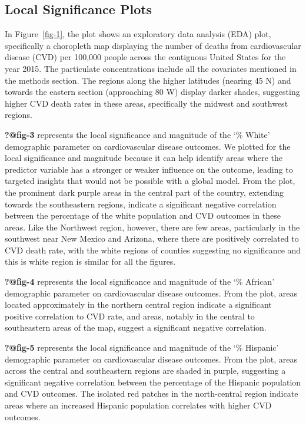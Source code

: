 \documentclass[
]{article}
\begin{document}
\subsection{Local Significance Plots}\label{local-significance-plots}

In Figure~\ref{fig-1}, the plot shows an exploratory data analysis (EDA)
plot, specifically a choropleth map displaying the number of deaths from
cardiovascular disease (CVD) per 100,000 people across the contiguous
United States for the year 2015. The particulate concentrations include
all the covariates mentioned in the methods section. The regions along
the higher latitudes (nearing 45 N) and towards the eastern section
(approaching 80 W) display darker shades, suggesting higher CVD death
rates in these areas, specifically the midwest and southwest regions.~

\textbf{?@fig-3} represents the local significance and magnitude of the
`\% White' demographic parameter on cardiovascular disease outcomes. We
plotted for the local significance and magnitude because it can help
identify areas where the predictor variable has a stronger or weaker
influence on the outcome, leading to targeted insights that would not be
possible with a global model. From the plot, the prominent dark purple
areas in the central part of the country, extending towards the
southeastern regions, indicate a significant negative correlation
between the percentage of the white population and CVD outcomes in these
areas. Like the Northwest region, however, there are few areas,
particularly in the southwest near New Mexico and Arizona, where there
are positively correlated to CVD death rate, with the white regions of
counties suggesting no significance and this is white region is similar
for all the figures.

\textbf{?@fig-4} represents the local significance and magnitude of the
`\% African' demographic parameter on cardiovascular disease outcomes.
From the plot, areas located approximately in the northern central
region indicate a significant positive correlation to CVD rate, and
areas, notably in the central to southeastern areas of the map, suggest
a significant negative correlation.

\textbf{?@fig-5} represents the local significance and magnitude of the
`\% Hispanic' demographic parameter on cardiovascular disease outcomes.
From the plot, areas across the central and southeastern regions are
shaded in purple, suggesting a significant negative correlation between
the percentage of the Hispanic population and CVD outcomes. The isolated
red patches in the north-central region indicate areas where an
increased Hispanic population correlates with higher CVD outcomes.~
\end{document}
